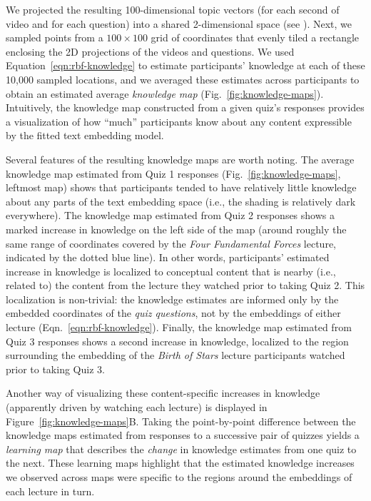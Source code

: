 \documentclass[10pt]{article}
\renewcommand{\nameref}[1]{\mbox{\textit{\oldnameref{#1}}}}
\begin{document}
We projected the resulting 100-dimensional topic vectors (for each second of
video and for each question) into a shared 2-dimensional space (see
\nameref{subsec:knowledge-maps}). Next, we sampled points from a $100 \times
100$ grid of coordinates that evenly tiled a rectangle enclosing the 2D
projections of the videos and questions. We used
Equation~\ref{eqn:rbf-knowledge} to estimate participants' knowledge at each of
these 10,000 sampled locations, and we averaged these estimates across
participants to obtain an estimated average \textit{knowledge map}
(Fig.~\ref{fig:knowledge-maps}). Intuitively, the knowledge map constructed
from a given quiz's responses provides a visualization of how ``much''
participants know about any content expressible by the fitted text embedding
model.

Several features of the resulting knowledge maps are worth noting. The average
knowledge map estimated from Quiz 1 responses (Fig.~\ref{fig:knowledge-maps},
leftmost map) shows that participants tended to have relatively little
knowledge about any parts of the text embedding space (i.e., the shading is
relatively dark everywhere). The knowledge map estimated from Quiz 2 responses
shows a marked increase in knowledge on the left side of the map (around
roughly the same range of coordinates covered by the \textit{Four Fundamental
Forces} lecture, indicated by the dotted blue line). In other words,
participants' estimated increase in knowledge is localized to conceptual
content that is nearby (i.e., related to) the content from the lecture they
watched prior to taking Quiz 2. This localization is non-trivial: the knowledge
estimates are informed only by the embedded coordinates of the \textit{quiz
questions}, not by the embeddings of either lecture
(Eqn.~\ref{eqn:rbf-knowledge}). Finally, the knowledge map estimated from Quiz
3 responses shows a second increase in knowledge, localized to the region
surrounding the embedding of the \textit{Birth of Stars} lecture participants
watched prior to taking Quiz 3.

Another way of visualizing these content-specific increases in knowledge
(apparently driven by watching each lecture) is displayed in
Figure~\ref{fig:knowledge-maps}B. Taking the point-by-point difference between
the knowledge maps estimated from responses to a successive pair of quizzes
yields a \textit{learning map} that describes the \textit{change} in knowledge
estimates from one quiz to the next. These learning maps highlight that the
estimated knowledge increases we observed across maps were specific to the
regions around the embeddings of each lecture in turn.
\end{document}
